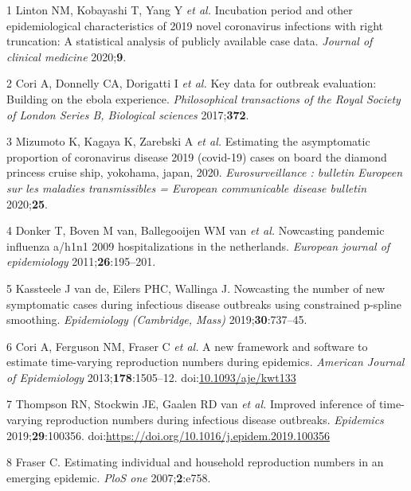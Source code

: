 \documentclass[
]{article}
\begin{document}
\hypertarget{refs}{}
\leavevmode\hypertarget{ref-Linton:2020gg}{}%
1 Linton NM, Kobayashi T, Yang Y \emph{et al.} Incubation period and
other epidemiological characteristics of 2019 novel coronavirus
infections with right truncation: A statistical analysis of publicly
available case data. \emph{Journal of clinical medicine}
2020;\textbf{9}.

\leavevmode\hypertarget{ref-Cori:2017fg}{}%
2 Cori A, Donnelly CA, Dorigatti I \emph{et al.} Key data for outbreak
evaluation: Building on the ebola experience. \emph{Philosophical
transactions of the Royal Society of London Series B, Biological
sciences} 2017;\textbf{372}.

\leavevmode\hypertarget{ref-Mizumoto:2020ct}{}%
3 Mizumoto K, Kagaya K, Zarebski A \emph{et al.} Estimating the
asymptomatic proportion of coronavirus disease 2019 (covid-19) cases on
board the diamond princess cruise ship, yokohama, japan, 2020.
\emph{Eurosurveillance : bulletin Europeen sur les maladies
transmissibles = European communicable disease bulletin}
2020;\textbf{25}.

\leavevmode\hypertarget{ref-Donker:2011fk}{}%
4 Donker T, Boven M van, Ballegooijen WM van \emph{et al.} Nowcasting
pandemic influenza a/h1n1 2009 hospitalizations in the netherlands.
\emph{European journal of epidemiology} 2011;\textbf{26}:195--201.

\leavevmode\hypertarget{ref-vandeKassteele:2019cn}{}%
5 Kassteele J van de, Eilers PHC, Wallinga J. Nowcasting the number of
new symptomatic cases during infectious disease outbreaks using
constrained p-spline smoothing. \emph{Epidemiology (Cambridge, Mass)}
2019;\textbf{30}:737--45.

\leavevmode\hypertarget{ref-cori2013}{}%
6 Cori A, Ferguson NM, Fraser C \emph{et al.} A new framework and
software to estimate time-varying reproduction numbers during epidemics.
\emph{American Journal of Epidemiology} 2013;\textbf{178}:1505--12.
doi:\href{https://doi.org/10.1093/aje/kwt133}{10.1093/aje/kwt133}

\leavevmode\hypertarget{ref-THOMPSON2019100356}{}%
7 Thompson RN, Stockwin JE, Gaalen RD van \emph{et al.} Improved
inference of time-varying reproduction numbers during infectious disease
outbreaks. \emph{Epidemics} 2019;\textbf{29}:100356.
doi:\href{https://doi.org/https://doi.org/10.1016/j.epidem.2019.100356}{https://doi.org/10.1016/j.epidem.2019.100356}

\leavevmode\hypertarget{ref-Fraser:2007hf}{}%
8 Fraser C. Estimating individual and household reproduction numbers in
an emerging epidemic. \emph{PloS one} 2007;\textbf{2}:e758.
\end{document}
